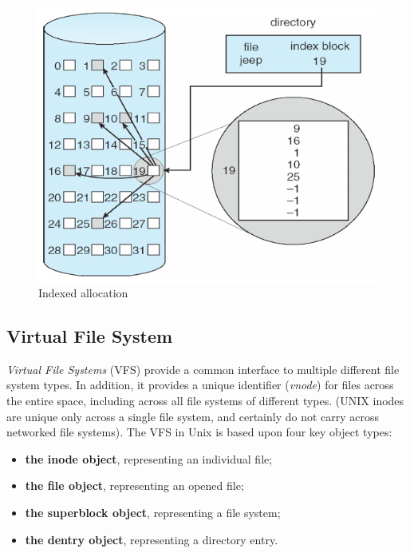 \begin{figure}[hbtp]
\centering
\includegraphics[scale=0.35]{images/file_system/indexed_allocation.png}
\caption{Indexed allocation}
\end{figure}

\subsection{Virtual File System}
\emph{Virtual File Systems} (VFS) provide a common interface to multiple different file system types. In addition, it provides a unique identifier (\emph{vnode}) for files across the entire space, including across all file systems of different types. (UNIX inodes are unique only across a single file system, and certainly do not carry across networked file systems). The VFS in Unix is based upon four key object types:
\begin{itemize}
\item \textbf{the inode object}, representing an individual file;
\item \textbf{the file object}, representing an opened file;
\item \textbf{the superblock object}, representing a file system;
\item \textbf{the dentry object}, representing a directory entry.
\end{itemize}

